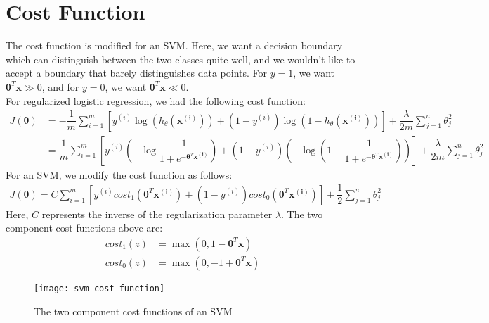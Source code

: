 \documentclass[a4paper, 12pt]{report}
\begin{document}
\section{Cost Function}
The cost function is modified for an SVM. Here, we want a decision boundary which can distinguish between the two classes quite well, and we wouldn't like to accept a boundary that barely distinguishes data points. For $y=1$, we want $\bm{\theta}^T\bm{x} \gg 0$, and for $y=0$, we want $\bm{\theta}^T\bm{x} \ll 0$. \\
\break
For regularized logistic regression, we had the following cost function:
\begin{align*}
J\left(\bm{\theta}\right) &= -\dfrac{1}{m}\sum_{i=1}^{m}\left[y^{\left(i\right)}\log\left(h_{\theta}\left(\bm{x^{\left(i\right)}}\right)\right) + \left(1 - y^{\left(i\right)}\right)\log \left(1 - h_{\theta}\left(\bm{x^{\left(i\right)}}\right)\right)\right] + \dfrac{\lambda}{2m}\sum_{j=1}^{n}\theta_j^2 \\
&= \dfrac{1}{m}\sum_{i=1}^{m}\left[y^{\left(i\right)}\left(-\log\dfrac{1}{1+e^{-\bm{\theta}^T\bm{x^{\left(i\right)}}}}\right) + \left(1 - y^{\left(i\right)}\right)\left(-\log\left(1 - \dfrac{1}{1+e^{-\bm{\theta}^T\bm{x^{\left(i\right)}}}}\right)\right)\right] + \dfrac{\lambda}{2m}\sum_{j=1}^{n}\theta_j^2
\end{align*}
For an SVM, we modify the cost function as follows:
\begin{align*}
J\left(\bm{\theta}\right) = C\sum_{i=1}^{m}\left[y^{\left(i\right)}cost_1\left(\bm{\theta}^T\bm{x^{\left(i\right)}}\right) + \left(1 - y^{\left(i\right)}\right)cost_0\left(\bm{\theta}^T\bm{x^{\left(i\right)}}\right)\right] + \dfrac{1}{2}\sum_{j=1}^{n}\theta_j^2
\end{align*}
Here, $C$ represents the inverse of the regularization parameter $\lambda$. The two component cost functions above are:
\begin{align*}
cost_1\left(z\right) &= \max\left(0, 1 - \bm{\theta}^T\bm{x}\right) \\
cost_0\left(z\right) &= \max\left(0, -1 + \bm{\theta}^T\bm{x}\right)
\end{align*}
\begin{figure}[H]
\centering
\texttt{[image: svm\_cost\_function]}
\caption{The two component cost functions of an SVM}
\end{figure}
\end{document}
